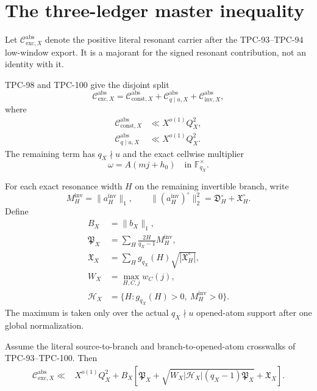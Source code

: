 \section{The three-ledger master inequality}
\label{sec:master-inequality}

Let
\(\mathcal C_{\mathrm{exc},X}^{\mathrm{abs}}\) denote the positive
literal resonant carrier after the TPC-93--TPC-94 low-window export.
It is a majorant for the signed resonant contribution, not an
identity with it.

TPC-98 and TPC-100 give the disjoint split
\[
 \mathcal C_{\mathrm{exc},X}^{\mathrm{abs}}
 =
 \mathcal C_{\mathrm{const},X}^{\mathrm{abs}}
 +
 \mathcal C_{q\mid u,X}^{\mathrm{abs}}
 +
 \mathcal C_{\mathrm{inv},X}^{\mathrm{abs}},
\]
where
\begin{align}
 \mathcal C_{\mathrm{const},X}^{\mathrm{abs}}
 &\ll X^{o(1)}Q_X^2,
\label{eq:constant-return}\\
 \mathcal C_{q\mid u,X}^{\mathrm{abs}}
 &\ll X^{o(1)}Q_X^2.
\label{eq:q-u-return}
\end{align}
The remaining term has \(q_X\nmid u\) and the exact cellwise
multiplier
\[
 \omega=A(mj+h_0)
 \quad\text{in }\mathbb F_{q_X}^{\times}.
\]

For each exact resonance width \(H\) on the remaining invertible
branch, write
\[
 M_H^{\mathrm{inv}}=\|a_H^{\mathrm{inv}}\|_1,\qquad
 \|(a_H^{\mathrm{inv}})^\circ\|_2^2
 =
 \mathfrak D_H^\circ+\mathfrak X_H^\circ.
\]
Define
\begin{align}
 B_X&=\|b_X\|_1,
\label{eq:BX}\\
 \mathfrak P_X
 &=
 \sum_H\frac{2H}{q_X-1}M_H^{\mathrm{inv}},
\label{eq:PX}\\
 \mathfrak X_X
 &=
 \sum_Hg_{q_X}(H)
 \sqrt{|\mathfrak X_H^\circ|},
\label{eq:XX}\\
 W_X
 &=
 \max_{H,C,j}w_C(j),
\label{eq:WX}\\
 \mathcal H_X
 &=
 \{H:g_{q_X}(H)>0,\ M_H^{\mathrm{inv}}>0\}.
\label{eq:HX}
\end{align}
The maximum is taken only over the actual \(q_X\nmid u\)
opened-atom support after one global normalization.

\begin{theorem}
\label{thm:master}
Assume the literal source-to-branch and branch-to-opened-atom
crosswalks of TPC-93--TPC-100.  Then
\begin{align}
 \mathcal C_{\mathrm{exc},X}^{\mathrm{abs}}
 \ll{}&
 X^{o(1)}Q_X^2
 +
 B_X
 \left[
 \mathfrak P_X
 +
 \sqrt{
 W_X|\mathcal H_X|(q_X-1)\mathfrak P_X}
 +
 \mathfrak X_X
 \right].
\label{eq:master}
\end{align}
\end{theorem}

